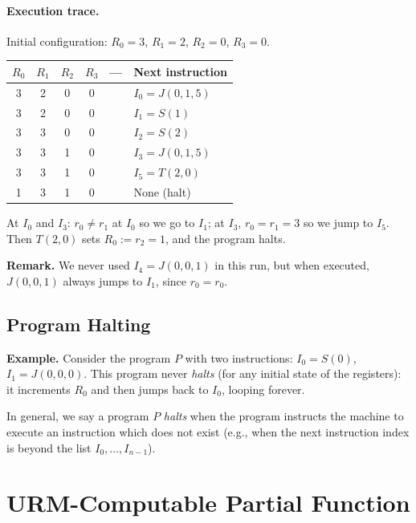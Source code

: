 \documentclass[11pt]{article}
\begin{document}
\paragraph{Execution trace.} Initial configuration: $R_0 = 3$, $R_1 = 2$, $R_2 = 0$, $R_3 = 0$.

\begin{center}
\renewcommand{\arraystretch}{1.2}
\begin{tabular}{|c|c|c|c|c|l|}
\hline
$R_0$ & $R_1$ & $R_2$ & $R_3$ & --- & Next instruction \\
\hline
3 & 2 & 0 & 0 & & $I_0 = J(0, 1, 5)$ \\
3 & 2 & 0 & 0 & & $I_1 = S(1)$ \\
3 & 3 & 0 & 0 & & $I_2 = S(2)$ \\
3 & 3 & 1 & 0 & & $I_3 = J(0, 1, 5)$ \\
3 & 3 & 1 & 0 & & $I_5 = T(2, 0)$ \\
1 & 3 & 1 & 0 & & None (halt) \\
\hline
\end{tabular}
\end{center}

At $I_0$ and $I_3$: $r_0 \neq r_1$ at $I_0$ so we go to $I_1$; at $I_3$, $r_0 = r_1 = 3$ so we jump to $I_5$. Then $T(2, 0)$ sets $R_0 := r_2 = 1$, and the program halts.

\textbf{Remark.} We never used $I_4 = J(0, 0, 1)$ in this run, but when executed, $J(0, 0, 1)$ always jumps to $I_1$, since $r_0 = r_0$.

\subsection{Program Halting}

\textbf{Example.} Consider the program $P$ with two instructions: $I_0 = S(0)$, $I_1 = J(0, 0, 0)$. This program never \emph{halts} (for any initial state of the registers): it increments $R_0$ and then jumps back to $I_0$, looping forever.

In general, we say a program $P$ \emph{halts} when the program instructs the machine to execute an instruction which does not exist (e.g., when the next instruction index is beyond the list $I_0, \dots, I_{n-1}$).

\section{URM-Computable Partial Function}
\end{document}
